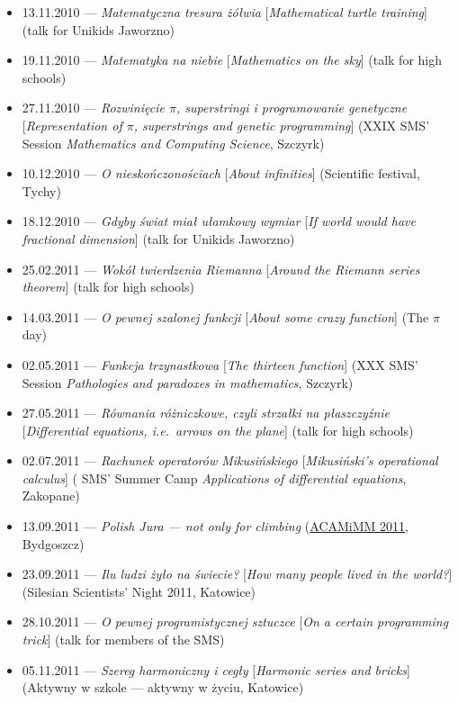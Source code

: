 \begin{itemize}
  \item 13.11.2010 --- \textsl{Matematyczna tresura żółwia} [\textsl{Mathematical turtle training}] (talk for Unikids Jaworzno)
  \item 19.11.2010 --- \textsl{Matematyka na niebie} [\textsl{Mathematics on the sky}] (talk for high schools)
  \item 27.11.2010 --- \textsl{Rozwinięcie $\pi$, superstringi i programowanie genetyczne} [\textsl{Representation of $\pi$, superstrings and genetic programming}] (XXIX SMS' Session \textsl{Mathematics and Computing Science}, Szczyrk)
  \item 10.12.2010 --- \textsl{O nieskończonościach} [\textsl{About infinities}] (Scientific festival, Tychy)
  \item 18.12.2010 --- \textsl{Gdyby świat miał ułamkowy wymiar} [\textsl{If world would have fractional dimension}] (talk for Unikids Jaworzno)
  \item 25.02.2011 --- \textsl{Wokół twierdzenia Riemanna} [\textsl{Around the Riemann series theorem}] (talk for high schools)
  \item 14.03.2011 --- \textsl{O pewnej szalonej funkcji} [\textsl{About some crazy function}] (The $\pi$ day)
  \item 02.05.2011 --- \textsl{Funkcja trzynastkowa} [\textsl{The thirteen function}] (XXX SMS' Session \textsl{Pathologies and paradoxes in mathematics}, Szczyrk)
  \item 27.05.2011 --- \textsl{Równania różniczkowe, czyli strzałki na płaszczyźnie} [\textsl{Differential equations, i.e.\ arrows on the plane}] (talk for high schools)
  \item 02.07.2011 --- \textsl{Rachunek operatorów Mikusińskiego} [\textsl{Mikusiński's operational calculus}] ( SMS' Summer Camp \textsl{Applications of differential equations}, Zakopane)
  \item 13.09.2011 --- \textsl{Polish Jura --- not only for climbing} (\href{\urlAcamimm}{ACAMiMM 2011}, Bydgoszcz)
  \item 23.09.2011 --- \textsl{Ilu ludzi żyło na świecie?} [\textsl{How many people lived in the world?}] (Silesian Scientists' Night 2011, Katowice)
  \item 28.10.2011 --- \textsl{O pewnej programistycznej sztuczce} [\textsl{On a certain programming trick}] (talk for members of the SMS)
  \item 05.11.2011 --- \textsl{Szereg harmoniczny i cegły} [\textsl{Harmonic series and bricks}] (Aktywny w szkole --- aktywny w życiu, Katowice)

\end{itemize}
